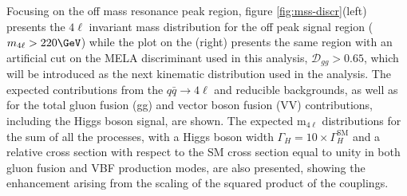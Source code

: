Focusing on the off mass resonance peak region, figure \ref{fig:mss-discr}(left) presents the $4\ell$ invariant mass distribution
for the off peak signal region ($m_{4\ell} > 220\GeV$) while the plot on the (right) presents the same region with an artificial cut on the MELA discriminant used in this analysis, $\mathcal{D}_{gg} > 0.65$, which will be introduced as the next kinematic distribution used in the analysis.
The expected contributions from the $q\bar{q} \to 4\ell$ and reducible backgrounds,
as well as for the total gluon fusion (gg) and vector boson fusion (VV) contributions, including the
Higgs boson signal, are shown. The expected m$_{4\ell}$ distributions for the sum of all the
processes, with a Higgs boson width $\Gamma_{H} = 10 \times \Gamma_{H}^{\mathrm{SM}}$ and a relative
cross section with respect to the SM cross section equal to unity in both gluon fusion and VBF production
modes, are also presented, showing the enhancement arising from the scaling of the squared product of the couplings. 

